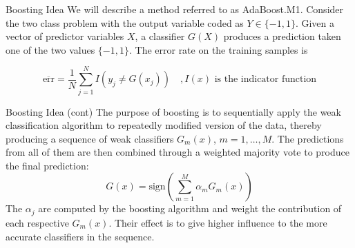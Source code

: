 \documentclass{beamer}
\begin{document}
\begin{frame}{Boosting Idea}
	We will describe a method referred to as AdaBoost.M1. Consider the two class problem with the output variable coded as $Y\in \{-1,1\}$. Given a vector of predictor variables $X$, a classifier $G(X)$ produces a prediction taken one of the two values $\{-1,1\}$. The error rate on the training samples is
	
	\begin{equation*}
		\overline{\text{err}}= \frac{1}{N} \sum_{j=1}^N I(y_j\ne G(x_j)) \quad ,I(x) \text{ is the indicator function}
	\end{equation*}

\end{frame}

\begin{frame}{Boosting Idea (cont)}
The purpose of boosting is to sequentially apply the weak classification algorithm to repeatedly modified version of the data, thereby producing a sequence of weak classifiers $G_m(x)$, $m=1,\ldots, M$. The predictions from all of them are then combined through a weighted majority vote to produce the final prediction:
\begin{equation*}
	G(x)= \text{sign}\left( \sum_{m=1}^M \alpha_m G_m (x) \right)
\end{equation*}
The $\alpha_j$ are computed by the boosting algorithm and weight the contribution of each respective $G_m(x)$. Their effect is to give higher influence to the more accurate classifiers in the sequence. 

\end{frame}
\end{document}
